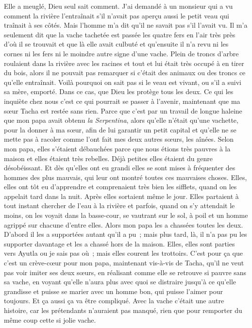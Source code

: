 \begin{pages}
\begin{Rightside}
		\pend
		\pstart
			Elle a meuglé, Dieu seul sait comment.
		\pend
		\pstart
			J’ai demandé à un monsieur qui a vu comment la rivière l’entraînait s’il n’avait pas aperçu aussi le petit veau qui traînait à ses côtés. Mais l’homme m’a dit qu’il ne savait pas s’il l’avait vu. Il m’a seulement dit que la vache tachetée est passée les quatre fers en l’air très près d’où il se trouvait et que là elle avait culbuté et qu’ensuite il n’a revu ni les cornes ni les fers ni le moindre autre signe d’une vache. Plein de troncs d’arbre roulaient dans la rivière avec les racines et tout et lui était très occupé à en tirer du bois, alors il ne pouvait pas remarquer si c’était des animaux ou des troncs ce qu’elle entraînait.
		\pend
		\pstart
			Voilà pourquoi on sait pas si le veau est vivant, ou s’il a suivi sa mère, emporté. Dans ce cas, que Dieu les protège tous les deux.
		\pend
		\pstart
			Ce qui les inquiète chez nous c’est ce qui pourrait se passer à l’avenir, maintenant que ma sœur Tacha est restée sans rien. Parce que c’est par un travail de longue haleine que mon papa avait obtenu \textit{la Serpentina}, alors qu’elle n’était qu’une vachette, pour la donner à ma sœur, afin de lui garantir un petit capital et qu’elle ne se mette pas à racoler comme l’ont fait mes deux autres sœurs, les aînées.
		\pend
		\pstart
			Selon mon papa, elles s’étaient débauchées parce que nous étions très pauvres à la maison et elles étaient très rebelles. Déjà petites elles étaient du genre désobéissant. Et dès qu’elles ont eu grandi elles se sont mises à fréquenter des hommes des plus mauvais, qui leur ont montré toutes ces mauvaises choses. Elles, elles ont tôt eu d’apprendre et comprenaient très bien les sifflets, quand on les appelait tard dans la nuit. Après elles sortaient même le jour. Elles partaient à tout instant chercher de l’eau à la rivière et parfois, quand on s’y attendait le moins, on les voyait dans la basse-cour, se vautrant sur le sol, à poil et un homme agrippé sur chacune d’entre elles.
		\pend
		\pstart
			Alors mon papa les a chassées toutes les deux. D’abord il les a supportées autant qu’il a pu ; mais plus tard, là, il n’a pas pu les supporter davantage et les a chassé hors de la maison. Elles, elles sont parties vers Ayutla ou je sais pas où ; mais elles courent les trottoirs.
		\pend
		\pstart
			C’est pour ça que c’est un crève-cœur pour mon papa, maintenant vis-à-vis de Tacha, qu’il ne veut pas voir imiter ses deux sœurs, en réalisant comme elle se retrouve si pauvre sans sa vache, en voyant qu’elle n’aura plus avec quoi se distraire jusqu’à ce qu’elle grandisse et puisse se marier avec un homme bon, qui puisse l’aimer pour toujours. Et ça aussi ça va être compliqué. Avec la vache c’était une autre histoire, car les prétendants n’auraient pas manqué, rien que pour remporter du même coup cette si jolie vache.

\end{Rightside}
\end{pages}
